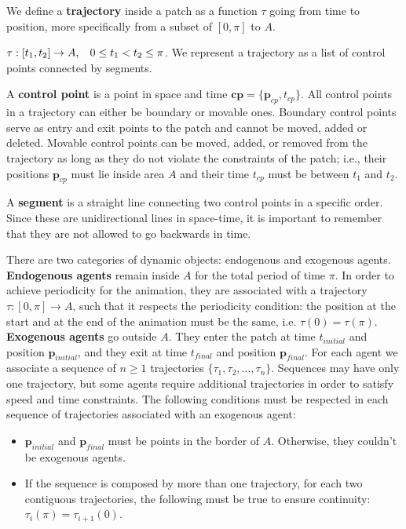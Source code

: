 We define a {\bf trajectory} inside a patch as a function $\tau$ going from time to position, more specifically from a subset of $[ 0,\pi ]$ to $A$.

$ \tau:[t_1,t_2]\rightarrow A, \hspace{0.3cm} 0 \leq t_1 < t_2 \leq \pi$.
We represent a trajectory as a list of control points connected by segments. 

A {\bf control point} is a point in space and time $\mathbf{cp} = \{\mathbf{p}_{cp}, t_{cp}\}$. All control points in a trajectory can either be boundary or movable ones. Boundary control points serve as entry and exit points to the patch and cannot be moved, added or deleted. Movable control points can be moved, added, or removed from the trajectory as long as they do not violate the constraints of the patch; i.e., their positions $\mathbf{p}_{cp}$ must lie inside area $A$ and their time $t_{cp}$ must be between $t_1$ and $t_2$.

A {\bf segment} is a straight line connecting two control points in a specific order. Since these are unidirectional lines in space-time, it is important to remember that they are not allowed to go backwards in time.

There are two categories of dynamic objects: endogenous and exogenous agents. {\bf Endogenous agents} remain inside $A$ for the total period of time $\pi$. In order to achieve periodicity for the animation, they are associated with a trajectory $\tau : [0,\pi] \rightarrow A$, such that it respects the periodicity condition: the position at the start and at the end of the animation must be the same, i.e. \mbox{$\tau (0) = \tau (\pi)$}.\\
{\bf Exogenous agents} go outside $A$. They enter the patch at time $t_{initial}$ and position $\mathbf{p}_{initial}$, and they exit at time $t_{final}$ and position $\mathbf{p}_{final}$. For each agent we associate a sequence of $n \ge 1$ trajectories $\{ \tau_1, \tau_2, \dots, \tau_n\}$. Sequences may have only one trajectory, but some agents require additional trajectories in order to satisfy speed and time constraints. The following conditions must be respected in each sequence of trajectories associated with an exogenous agent:

\begin{itemize}

\item{$\mathbf{p}_{initial}$ and $\mathbf{p}_{final}$ must be points in the border of $A$. Otherwise, they couldn't be exogenous agents.}

\item{If the sequence is composed by more than one trajectory, for each two contiguous trajectories, the following must be true to ensure continuity: $\tau_i(\pi) = \tau_{i+1}(0)$.}

\end{itemize}

